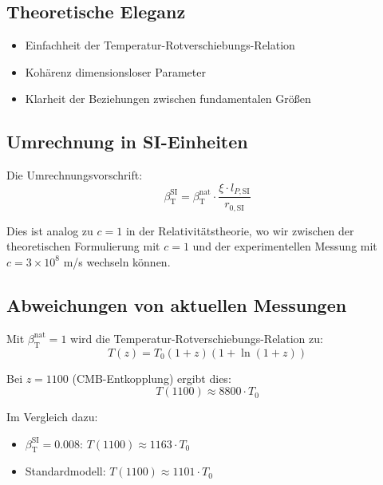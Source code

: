 \documentclass[12pt,a4paper]{article}
\newcommand{\betaT}{\beta_{\text{T}}}
\begin{document}
	\subsection{Theoretische Eleganz}
	
	\begin{itemize}
		\item Einfachheit der Temperatur-Rotverschiebungs-Relation
		\item Kohärenz dimensionsloser Parameter
		\item Klarheit der Beziehungen zwischen fundamentalen Größen
	\end{itemize}
	
	\subsection{Umrechnung in SI-Einheiten}
	
	Die Umrechnungsvorschrift:
	\begin{equation}
		\betaT^{\text{SI}} = \betaT^{\text{nat}} \cdot \frac{\xi \cdot l_{P,\text{SI}}}{r_{0,\text{SI}}}
	\end{equation}
	
	Dies ist analog zu \(c = 1\) in der Relativitätstheorie, wo wir zwischen der theoretischen Formulierung mit \(c = 1\) und der experimentellen Messung mit \(c = 3 \times 10^8\) m/s wechseln können.
	
	\subsection{Abweichungen von aktuellen Messungen}
	
	Mit \(\betaT^{\text{nat}} = 1\) wird die Temperatur-Rotverschiebungs-Relation zu:
	\begin{equation}
		T(z) = T_0 (1 + z) (1 + \ln(1 + z))
	\end{equation}
	
	Bei \(z = 1100\) (CMB-Entkopplung) ergibt dies:
	\begin{equation}
		T(1100) \approx 8800 \cdot T_0
	\end{equation}
	
	Im Vergleich dazu:
	\begin{itemize}
		\item \(\betaT^{\text{SI}} = 0.008\): \(T(1100) \approx 1163 \cdot T_0\)
		\item Standardmodell: \(T(1100) \approx 1101 \cdot T_0\)
	\end{itemize}
	
\end{document}
